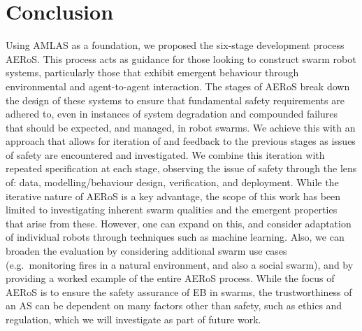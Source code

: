 \documentclass[runningheads]{llncs}
\begin{document}
\section{Conclusion} \label{discussion-conclusions}
Using AMLAS \cite{Hawkins2021} as a foundation, we proposed the six-stage development process AERoS. This process acts as guidance for those looking to construct swarm robot systems, particularly those that exhibit emergent behaviour through environmental and agent-to-agent interaction. The stages of AERoS break down the design of these systems to ensure that fundamental safety requirements are adhered to, even in instances of system degradation and compounded failures that should be expected, and managed, in robot swarms. We achieve this with an approach that allows for iteration of and feedback to the previous stages as issues of safety are encountered and investigated. We combine this iteration with repeated specification at each stage, observing the issue of safety through the lens of: data, modelling/behaviour design, verification, and deployment. 
While the iterative nature of AERoS is a key advantage, the scope of this work has been limited to investigating inherent swarm qualities and the emergent properties that arise from these. 
However, one can expand on this, and consider adaptation of individual robots through techniques such as machine learning. %
Also, we can broaden the evaluation by considering additional swarm use cases (e.g.\ monitoring fires in a natural environment, and also a social swarm), and by providing a worked example of the entire AERoS process. 
While the focus of AERoS is to ensure the safety assurance of EB in swarms, the trustworthiness of an AS can be dependent on many factors other than safety, such as ethics and regulation, which we will investigate as part of future work.%
\end{document}
